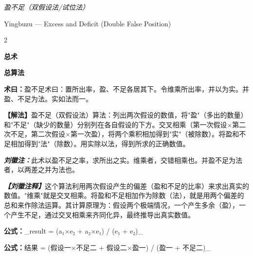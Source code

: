 \documentclass[10pt,a4paper]{article}
\newcommand{\shu}[1]{\textbf{术曰：}#1\par}
\newcommand{\liuhui}[1]{{\color{commentarycolor}\textit{\textbf{刘徽注：}}#1\par}}
\newcommand{\classicalheader}[1]{{\centering\large\bfseries\color{classicalcolor} #1\par\vspace{0.5em}}}
\newcommand{\shumodern}[1]{\textbf{【解法】}#1\par}
\newcommand{\liuhuimodern}[1]{{\color{commentarycolor}\textit{\textbf{【刘徽注释】}}#1\par}}
\newcommand{\modernheader}[1]{{\centering\large\bfseries\color{moderncolor} #1\par\vspace{0.5em}}}
\begin{document}
\begin{center}
{\Large\itshape\color{volcolor} 盈不足（双假设法/试位法）}

\vspace{0.3cm}
{\normalsize Yingbuzu --- Excess and Deficit (Double False Position)}
\end{center}

\vspace{0.5cm}

\begin{paracol}{2}
\classicalheader{总术}
\switchcolumn
\modernheader{总算法}
\switchcolumn*

\shu{盈不足术曰：置所出率，盈、不足各居其下。令维乘所出率，并以为实。并盈、不足为法。实如法而一。}

\switchcolumn

\shumodern{盈不足（双假设法）算法：列出两次假设的数值，将"盈"（多出的数量）和"不足"（缺少的数量）分别列在各自假设的下方。交叉相乘（第一次假设×第二次不足，第二次假设×第一次盈），将两个乘积相加得到"实"（被除数）。将盈和不足相加得到"法"（除数）。用实除以法，得到所求的正确数值。}

\switchcolumn*

\liuhui{此术以盈不足之率，求所出之实。维乘者，交错相乘也。并盈不足为法者，以两差之并为法也。}

\switchcolumn

\liuhuimodern{这个算法利用两次假设产生的偏差（盈和不足的比率）来求出真实的数值。"维乘"就是交叉相乘。将盈和不足相加作为除数（法），就是用两个偏差的总和来作除法运算。其计算原理为：假设两个极端情况，一个产生多余（盈），一个产生不足，通过交叉相乘来齐同化异，最终推导出真实数值。}

\switchcolumn*

{\small\textbf{公式：}_result = (a₁×e₂ + a₂×e₁) / (e₁ + e₂)_}

\switchcolumn

{\small\textbf{公式：}结果 = (假设一×不足二 + 假设二×盈一) / (盈一 + 不足二)_}

\end{paracol}

\vspace{0.5cm}

\end{document}
